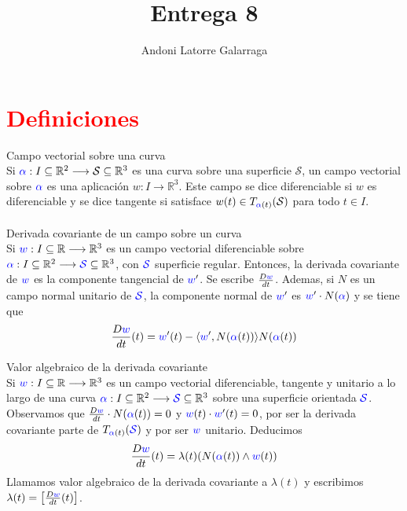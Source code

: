 \documentclass{article}
\title{Entrega 8}
\author{Andoni Latorre Galarraga}
\date{}
\newcommand{\bb}[1]{\mathbb{#1}}
\begin{document}
\maketitle
\section*{\textcolor{red}{Definiciones}}

\textcolor{WildStrawberry}{Campo vectorial sobre una curva}\\
Si $\textcolor{blue}{\alpha}: I\subseteq \bb{R}^2 \longrightarrow \mathcal{S}\subseteq \bb{R}^3$ es una curva sobre una superficie $\mathcal{S}$, un \textcolor{WildStrawberry}{campo vectorial sobre} $\textcolor{blue}{\alpha}$ es una aplicación $w:I\longrightarrow \bb{R}^3$. Este campo se dice \textcolor{WildStrawberry}{diferenciable} si $w$ es diferenciable y se dice \textcolor{WildStrawberry}{tangente} si satisface $w(t)\in T_{\textcolor{blue}{\alpha}(t)}(\mathcal{S})$ para todo $t\in I$.\\\\

\textcolor{WildStrawberry}{Derivada covariante de un campo sobre un curva}\\
Si $\textcolor{blue}{w}: I \subseteq \bb{R} \longrightarrow \bb{R}^3$ es un campo vectorial diferenciable sobre $\textcolor{blue}{\alpha}: I\subseteq \bb{R}^2 \longrightarrow \textcolor{blue}{\mathcal{S}}\subseteq \bb{R}^3$, con $\textcolor{blue}{\mathcal{S}}$ superficie regular. Entonces, la \textcolor{WildStrawberry}{derivada covariante de} $\textcolor{blue}{w}$ es la componente tangencial de $\textcolor{blue}{w}'$. Se escribe $\frac{D \textcolor{blue}{w}}{dt}$. Ademas, si $N$ es un campo normal unitario de $\textcolor{blue}{\mathcal{S}}$, la componente normal de $\textcolor{blue}{w}'$ es $\textcolor{blue}{w}'\cdot N(\textcolor{blue}{\alpha})$ y se tiene que
$$
\frac{D \textcolor{blue}{w}}{dt}(t) = \textcolor{blue}{w}'(t) - \langle \textcolor{blue}{w}', N(\textcolor{blue}{\alpha}(t)) \rangle N(\textcolor{blue}{\alpha}(t))
$$

\textcolor{WildStrawberry}{Valor algebraico de la derivada covariante}\\
Si $\textcolor{blue}{w}: I \subseteq \bb{R} \longrightarrow \bb{R}^3$ es un campo vectorial diferenciable, tangente y unitario a lo largo de una curva $\textcolor{blue}{\alpha}: I\subseteq \bb{R}^2 \longrightarrow \textcolor{blue}{\mathcal{S}}\subseteq \bb{R}^3$ sobre una superficie orientada $\textcolor{blue}{\mathcal{S}}$. Observamos que $\frac{D \textcolor{blue}{w}}{dt}\cdot N(\textcolor{blue}{\alpha}(t)) = 0$ y $\textcolor{blue}{w}(t)\cdot \textcolor{blue}{w}'(t)=0$, por ser la derivada covariante parte de $T_{\textcolor{blue}{\alpha}(t)}(\textcolor{blue}{\mathcal{S}})$ y por ser $\textcolor{blue}{w}$ unitario. Deducimos
$$
\frac{D \textcolor{blue}{w}}{dt}(t) = \lambda(t) (N(\textcolor{blue}{\alpha}(t)) \land \textcolor{blue}{w}(t) )
$$
Llamamos \textcolor{WildStrawberry}{valor algebraico de la derivada covariante} a $\lambda(t)$ y escribimos $\lambda(t) = \left[\frac{D \textcolor{blue}{w}}{dt}(t)\right]$.\\\\
\end{document}
